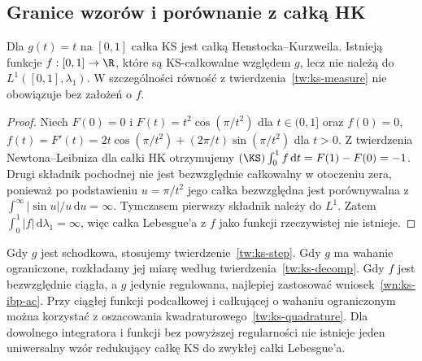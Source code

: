 \subsection*{Granice wzorów i porównanie z całką HK}
\begin{stwierdzenie}
Dla $g(t)=t$ na $[0,1]$ całka KS jest całką Henstocka--Kurzweila. Istnieją funkcje $f:[0,1]\to\R$, które są KS-całkowalne względem $g$, lecz nie należą do $L^1([0,1],\lambda_1)$. W szczególności równość z twierdzenia~\ref{tw:ks-measure} nie obowiązuje bez założeń o $f$.
\end{stwierdzenie}
\begin{proof}
Niech $F(0)=0$ i $F(t)=t^2\cos(\pi/t^2)$ dla $t\in(0,1]$ oraz $f(0)=0$, $f(t)=F'(t)=2t\cos(\pi/t^2)+(2\pi/t)\sin(\pi/t^2)$ dla $t>0$. Z twierdzenia Newtona--Leibniza dla całki HK otrzymujemy $(\KS)\int_0^1 f\,\mathrm dt=F(1)-F(0)=-1$. Drugi składnik pochodnej nie jest bezwzględnie całkowalny w otoczeniu zera, ponieważ po podstawieniu $u=\pi/t^2$ jego całka bezwzględna jest porównywalna z $\int^\infty|\sin u|/u\,\mathrm du=\infty$. Tymczasem pierwszy składnik należy do $L^1$. Zatem $\int_0^1|f|\,\mathrm d\lambda_1=\infty$, więc całka Lebesgue'a z $f$ jako funkcji rzeczywistej nie istnieje.
\end{proof}

\begin{uwaga}
Gdy $g$ jest schodkowa, stosujemy twierdzenie~\ref{tw:ks-step}. Gdy $g$ ma wahanie ograniczone, rozkładamy jej miarę według twierdzenia~\ref{tw:ks-decomp}. Gdy $f$ jest bezwzględnie ciągła, a $g$ jedynie regulowana, najlepiej zastosować wniosek~\ref{wn:ks-ibp-ac}. Przy ciągłej funkcji podcałkowej i całkującej o wahaniu ograniczonym można korzystać z oszacowania kwadraturowego~\ref{tw:ks-quadrature}. Dla dowolnego integratora i funkcji bez powyższej regularności nie istnieje jeden uniwersalny wzór redukujący całkę KS do zwykłej całki Lebesgue'a.
\end{uwaga}

